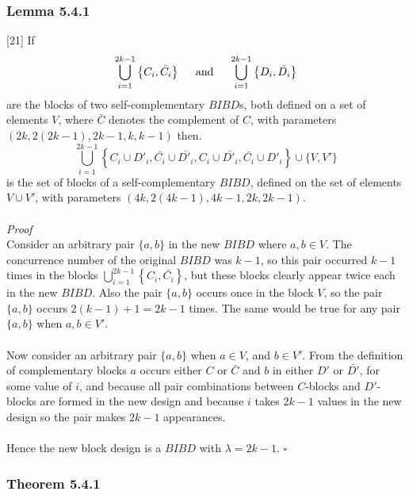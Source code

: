 \documentclass[
  12pt,
  a4paper]{book}
\begin{document}
\hypertarget{lemma-5.4.1}{%
\subsubsection{Lemma 5.4.1}\label{lemma-5.4.1}}

{[}21{]} If
\[\bigcup\limits_{i=1}^{2k-1} \left \{C_i,\bar{C_i} \right \} \hspace{0.5cm} \mathrm{and} \hspace{0.5cm} 
\bigcup\limits_{i=1}^{2k-1} \left \{D_i,\bar{D_i} \right \}\] are the
blocks of two self-complementary \(BIBD\)s, both defined on a set of
elements \(V\), where \(\bar{C}\) denotes the complement of \(C\), with
parameters \((2k,2(2k-1),2k-1,k,k-1)\) then.
\[\bigcup\limits_{i=1}^{2k-1} \left \{C_i \cup D'_i, \bar{C_i} \cup \bar{D'_i}, C_i \cup \bar{D'_i},
\bar{C_i} \cup D'_i  \right \} \cup \{V,V'\}\] is the set of blocks of a
self-complementary \(BIBD\), defined on the set of elements \(V \cup V'\),
with parameters \((4k,2(4k-1),4k-1,2k,2k-1)\).\\
~\\
\emph{Proof}\\
Consider an arbitrary pair \(\{a,b\}\) in the new \(BIBD\) where
\(a,b \in V\). The concurrence number of the original \(BIBD\) was \(k-1\), so
this pair occurred \(k-1\) times in the blocks
\(\bigcup\limits_{i=1}^{2k-1} \left \{C_i,\bar{C_i} \right \}\), but these
blocks clearly appear twice each in the new \(BIBD\). Also the pair
\(\{a,b\}\) occurs once in the block \(V\), so the pair \(\{a,b\}\) occurs
\(2(k-1)+1 = 2k-1\) times. The same would be true for any pair \(\{a,b\}\)
when \(a,b \in V'\).\\
~\\
Now consider an arbitrary pair \(\{a,b\}\) when \(a \in V\), and \(b \in V'\).
From the definition of complementary blocks \(a\) occurs either \(C\) or
\(\bar{C}\) and \(b\) in either \(D'\) or \(\bar{D'}\), for some value of \(i\),
and because all pair combinations between \(C\)-blocks and \(D'\)-blocks are
formed in the new design and because \(i\) takes \(2k-1\) values in the new
design so the pair makes \(2k-1\) appearances.\\
~\\
Hence the new block design is a \(BIBD\) with \(\lambda =2k-1\). \(\square\)

\hypertarget{theorem-5.4.1}{%
\subsubsection{Theorem 5.4.1}\label{theorem-5.4.1}}
\end{document}
